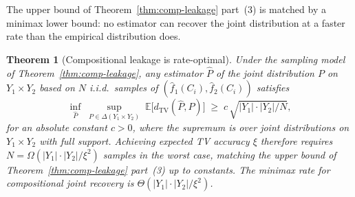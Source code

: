 \documentclass[conference]{IEEEtran}
\theoremstyle{definition}
\theoremstyle{plain}
\newtheorem{theorem}{Theorem}[section]
\theoremstyle{remark}
\newcommand{\fhat}{\hat{f}}
\newcommand{\TV}{d_{\mathrm{TV}}}
\begin{document}
The upper bound of Theorem~\ref{thm:comp-leakage} part~(3) is
matched by a minimax lower bound: no estimator can recover the joint
distribution at a faster rate than the empirical distribution does.

\begin{theorem}[Compositional leakage is rate-optimal]
\label{thm:comp-leakage-lb}
Under the sampling model of Theorem~\ref{thm:comp-leakage}, any
estimator $\hat{P}$ of the joint distribution $P$ on $Y_1 \times Y_2$
based on $N$ i.i.d.\ samples of $(\fhat_1(C_i), \fhat_2(C_i))$
satisfies
\begin{equation}
\label{eq:lecam-lb}
\inf_{\hat{P}} \;\sup_{P \in \Delta(Y_1 \times Y_2)} \;
\mathbb{E}\bigl[\TV(\hat{P}, P)\bigr] \;\geq\; c\,\sqrt{|Y_1| \cdot |Y_2| / N},
\end{equation}
for an absolute constant $c > 0$, where the supremum is over joint
distributions on $Y_1 \times Y_2$ with full support.  Achieving expected
TV accuracy $\xi$ therefore requires $N = \Omega(|Y_1| \cdot |Y_2| / \xi^2)$
samples in the worst case, matching the upper bound of
Theorem~\ref{thm:comp-leakage} part~(3) up to constants.  The minimax
rate for compositional joint recovery is
$\Theta(|Y_1| \cdot |Y_2| / \xi^2)$.
\end{theorem}
\end{document}
